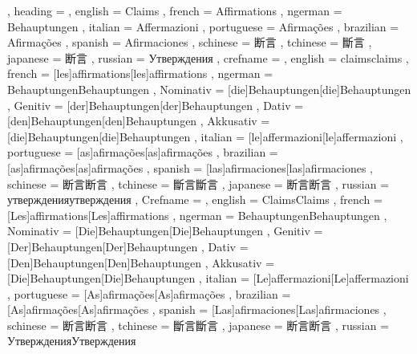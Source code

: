   {
    , heading =   {
                    , english     = Claims
                    , french      = Affirmations
                    , ngerman     = Behauptungen
                    , italian     = Affermazioni
                    , portuguese  = Afirmações
                    , brazilian   = Afirmações
                    , spanish     = Afirmaciones
                    , schinese    = 断言
                    , tchinese    = 斷言
                    , japanese    = 断言
                    , russian     = Утверждения
                  }
    , crefname =  {
                    , english     = {claims}{claims}
                    , french      = [les]{affirmations}[les]{affirmations}
                    , ngerman     = { {Behauptungen}{Behauptungen}
                                      , Nominativ = [die]{Behauptungen}[die]{Behauptungen}
                                      , Genitiv   = [der]{Behauptungen}[der]{Behauptungen}
                                      , Dativ     = [den]{Behauptungen}[den]{Behauptungen}
                                      , Akkusativ = [die]{Behauptungen}[die]{Behauptungen}
                                    }
                    , italian     = [le]{affermazioni}[le]{affermazioni}
                    , portuguese  = [as]{afirmações}[as]{afirmações}
                    , brazilian   = [as]{afirmações}[as]{afirmações}
                    , spanish     = [las]{afirmaciones}[las]{afirmaciones}
                    , schinese    = {断言}{断言}
                    , tchinese    = {斷言}{斷言}
                    , japanese    = {断言}{断言}
                    , russian     = {утверждения}{утверждения}
                  }
    , Crefname =  {
                    , english     = {Claims}{Claims}
                    , french      = [Les]{affirmations}[Les]{affirmations}
                    , ngerman     = { {Behauptungen}{Behauptungen}
                                      , Nominativ = [Die]{Behauptungen}[Die]{Behauptungen}
                                      , Genitiv   = [Der]{Behauptungen}[Der]{Behauptungen}
                                      , Dativ     = [Den]{Behauptungen}[Den]{Behauptungen}
                                      , Akkusativ = [Die]{Behauptungen}[Die]{Behauptungen}
                                    }
                    , italian     = [Le]{affermazioni}[Le]{affermazioni}
                    , portuguese  = [As]{afirmações}[As]{afirmações}
                    , brazilian   = [As]{afirmações}[As]{afirmações}
                    , spanish     = [Las]{afirmaciones}[Las]{afirmaciones}
                    , schinese    = {断言}{断言}
                    , tchinese    = {斷言}{斷言}
                    , japanese    = {断言}{断言}
                    , russian     = {Утверждения}{Утверждения}
                  }
  }

